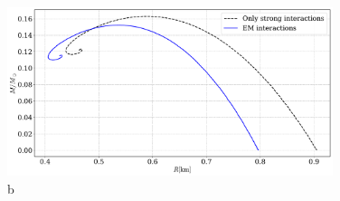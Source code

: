 \begin{figure}[!htb]
    \centering
    \includegraphics[width=0.85\textwidth]{../scripts/figurer/pion_star/mass_radius_pion_star_compare.pdf}
    \caption{b
        }
        \label{fig: mass-radius relation comparison}
\end{figure}
